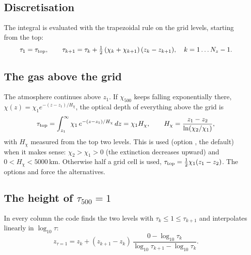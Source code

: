 \subsection{Discretisation}
The integral is evaluated with the trapezoidal rule on the grid levels, starting from the top:
\begin{equation}
\tau_1=\tau_{\rm top},\qquad \tau_{k+1}=\tau_k+\tfrac12\,(\chi_k+\chi_{k+1})\,(z_k-z_{k+1}),\quad k=1\dots N_z-1 .
\end{equation}

\subsection{The gas above the grid}
The atmosphere continues above $z_1$. If $\chi_{500}$ keeps falling exponentially there,
$\chi(z)=\chi_1e^{-(z-z_1)/H_\chi}$, the optical depth of everything above the grid is
\begin{equation}
\tau_{\rm top}=\int_{z_1}^{\infty}\chi_1\,e^{-(z-z_1)/H_\chi}\,dz=\chi_1H_\chi ,\qquad
H_\chi=\frac{z_1-z_2}{\ln(\chi_2/\chi_1)} ,\label{eq:tautop}
\end{equation}
with $H_\chi$ measured from the top two levels. This is used (option , the default) when it makes sense:
$\chi_2>\chi_1>0$ (the extinction decreases upward) and $0<H_\chi<5000$\,km. Otherwise half a grid cell is used,
$\tau_{\rm top}=\tfrac12\chi_1(z_1-z_2)$. The options  and  force the alternatives.

\subsection{\texorpdfstring{The height of $\tau_{500}=1$}{The height of tau500 = 1}}
In every column the code finds the two levels with $\tau_k\le1\le\tau_{k+1}$ and interpolates linearly in $\log_{10}\tau$:
\begin{equation}
z_{\tau=1}=z_k+(z_{k+1}-z_k)\,\frac{0-\log_{10}\tau_k}{\log_{10}\tau_{k+1}-\log_{10}\tau_k}.
\end{equation}

